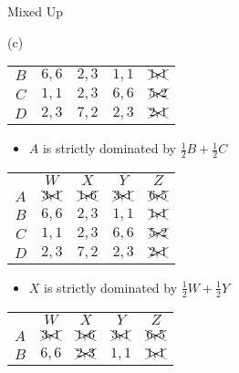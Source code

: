 \documentclass[8pt]{extarticle}
\begin{document}
\begin{problem}{Mixed Up}
\begin{problem}{(c)}
\begin{center}
\begin{tabular}{c|c|c|c|c|}
          \cline{2-5}
          $B$ & $6,6$ & $2,3$ & $1,1$ & $\xcancel{1,1}$ \\
          \cline{2-5}
          $C$ & $1,1$ & $2,3$ & $6,6$ & $\xcancel{5,2}$ \\
          \cline{2-5}
          $D$ & $2,3$ & $7,2$ & $2,3$ & $\xcancel{2,1}$\\
          \cline{2-5}
        \end{tabular}
      \end{center}
      \begin{itemize}
        \item $A$ is strictly dominated by $\frac{1}{2}B + \frac{1}{2}C$
      \end{itemize}
      \begin{center}
        \renewcommand{\arraystretch}{1.5}
        \begin{tabular}{c|c|c|c|c|}
          \multicolumn{1}{c}{} & \multicolumn{1}{c}{$W$} & \multicolumn{1}{c}{$X$} & \multicolumn{1}{c}{$Y$} & \multicolumn{1}{c}{$Z$}\\
          \cline{2-5}
          $A$ & $\xcancel{3,1}$ & $\xcancel{1,6}$ & $\xcancel{3,1}$ & $\xcancel{6,5}$ \\
          \cline{2-5}
          $B$ & $6,6$ & $2,3$ & $1,1$ & $\xcancel{1,1}$ \\
          \cline{2-5}
          $C$ & $1,1$ & $2,3$ & $6,6$ & $\xcancel{5,2}$ \\
          \cline{2-5}
          $D$ & $2,3$ & $7,2$ & $2,3$ & $\xcancel{2,1}$\\
          \cline{2-5}
        \end{tabular}
      \end{center}
      \begin{itemize}
        \item $X$ is strictly dominated by $\frac{1}{2}W + \frac{1}{2}Y$
      \end{itemize}
      \begin{center}
        \renewcommand{\arraystretch}{1.5}
        \begin{tabular}{c|c|c|c|c|}
          \multicolumn{1}{c}{} & \multicolumn{1}{c}{$W$} & \multicolumn{1}{c}{$X$} & \multicolumn{1}{c}{$Y$} & \multicolumn{1}{c}{$Z$}\\
          \cline{2-5}
          $A$ & $\xcancel{3,1}$ & $\xcancel{1,6}$ & $\xcancel{3,1}$ & $\xcancel{6,5}$ \\
          \cline{2-5}
          $B$ & $6,6$ & $\xcancel{2,3}$ & $1,1$ & $\xcancel{1,1}$ \\

\end{tabular}
\end{center}
\end{problem}
\end{problem}
\end{document}
